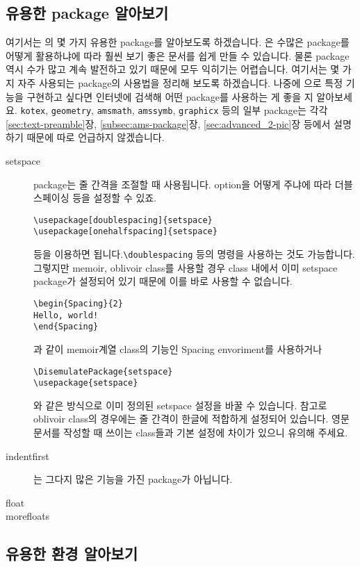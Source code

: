 \subsection{유용한 package 알아보기}
\label{sec:advanced-package}
여기서는 \lt 의 몇 가지 유용한 package를 알아보도록 하겠습니다.
\lt 은 수많은 package를 어떻게 활용하냐에 따라 훨씬 보기 좋은 문서를 쉽게 만들 수 있습니다.
물론 package 역시 수가 많고 계속 발전하고 있기 때문에 모두 익히기는 어렵습니다.
여기서는 몇 가지 자주 사용되는 package의 사용법을 정리해 보도록 하겠습니다.
나중에 \lt 으로 특정 기능을 구현하고 싶다면 인터넷에 검색해 어떤 package를 사용하는 게 좋을 지 알아보세요. \verb|kotex|, \verb|geometry|, \verb|amsmath|, \verb|amssymb|, \verb|graphicx| 등의 일부 package는 각각 \ref{sec:text-preamble}장, \ref{subsec:ams-package}장, \ref{sec:advanced_2-pic}장 등에서 설명하기 때문에 따로 언급하지 않겠습니다.
\begin{description}
\item[setspace] package는 줄 간격을 조절할 때 사용됩니다. option을 어떻게 주냐에 따라 더블스페이싱 등을 설정할 수 있죠.
\begin{Verbatim}
\usepackage[doublespacing]{setspace}  \usepackage[onehalfspacing]{setspace}
\end{Verbatim}
등을 이용하면 됩니다.\verb|\doublespacing| 등의 명령을 사용하는 것도 가능합니다. 그렇지만 memoir, oblivoir class를 사용할 경우 class 내에서 이미 setspace package가 설정되어 있기 때문에 이를 바로 사용할 수 없습니다.
\begin{Verbatim}
\begin{Spacing}{2}
Hello, world!
\end{Spacing}
\end{Verbatim}
과 같이 memoir계열 class의 기능인 Spacing envoriment를 사용하거나
\begin{Verbatim}
\DisemulatePackage{setspace}
\usepackage{setspace}
\end{Verbatim}
와 같은 방식으로 이미 정의된 setspace 설정을 바꿀 수 있습니다.
참고로 oblivoir class의 경우에는 줄 간격이 한글에 적합하게 설정되어 있습니다.
영문 문서를 작성할 때 쓰이는  class들과 기본 설정에 차이가 있으니 유의해 주세요.
\item[indentfirst] 는 그다지 많은 기능을 가진 package가 아닙니다.
\item[float] 
\item[morefloats] 
\end{description}

\subsection{유용한 환경 알아보기}
\label{sec:advanced-environment}






